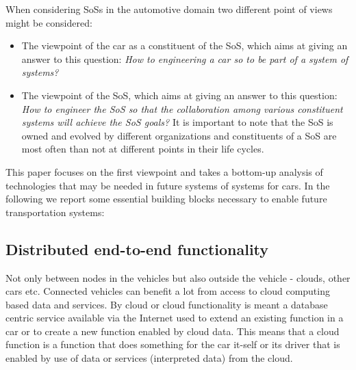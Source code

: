 \documentclass{llncs}
\begin{document}
When considering SoSs in the automotive domain two different point of views might be considered: 

\begin{itemize}
\item The viewpoint of the car as a constituent of the SoS, which aims at giving an answer to this question: {\em How to engineering a car so to be part of a system of systems?}
\item The viewpoint of the SoS, which aims at giving an answer to this question: {\em How to engineer the SoS so that the collaboration among various constituent systems will achieve the SoS goals?} It is important to note that the SoS is owned and evolved by different organizations and constituents of a SoS are most often than not at different points in their life cycles. 
\end{itemize}

This paper focuses on the first viewpoint and takes a bottom-up analysis of technologies that may be needed in future systems of systems for cars. %
In the following we report some essential building blocks necessary to enable future transportation systems:

\subsection*{Distributed end-to-end functionality} 

Not only between nodes in the vehicles but also outside the vehicle - clouds, other cars etc. Connected vehicles can benefit a lot from access to cloud computing based data and services. By cloud or cloud functionality is meant a database centric service available via the Internet used to extend an existing function in a car or to create a new function enabled by cloud data. This means that a cloud function is a function that does something for the car it-self or its driver that is enabled by use of data or services (interpreted data) from the cloud.
\end{document}
